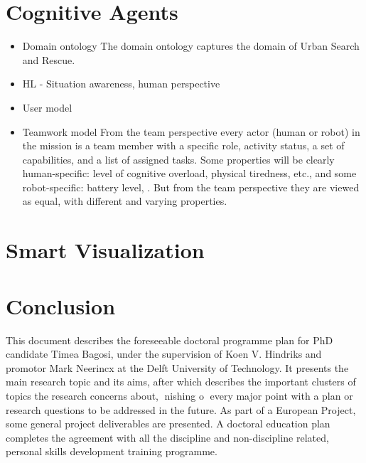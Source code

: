 \chapter{Cognitive Agents}
\begin{itemize}
\item Domain ontology
The domain ontology captures the domain of Urban Search and Rescue.
\item HL - Situation awareness, human perspective
\item User model
\item Teamwork model
From the team perspective every actor (human or robot) in the mission is a team member with a specific role, activity status, a set of capabilities, and a list of assigned tasks. Some properties will be clearly human-specific: level of cognitive overload, physical tiredness, etc., and some robot-specific: battery level, . But from the team perspective they are viewed as equal, with different and varying properties.  
\end{itemize}
\chapter{Smart Visualization}
\chapter{Conclusion}
This document describes the foreseeable doctoral programme plan for PhD
candidate Timea Bagosi, under the supervision of Koen V. Hindriks and
promotor Mark Neerincx at the Delft University of Technology. It presents
the main research topic and its aims, after which describes the important
clusters of topics the research concerns about, nishing o every major point
with a plan or research questions to be addressed in the future. As part
of a European Project, some general project deliverables are presented. A
doctoral education plan completes the agreement with all the discipline and
non-discipline related, personal skills development training programme.
    
  
  
  